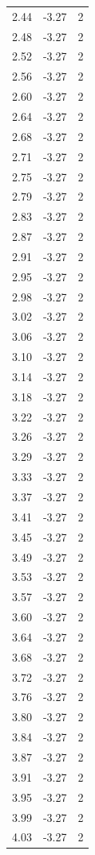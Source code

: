 \begin{longtable}{lrr}
  2.44 & -3.27 & 2 \\
  2.48 & -3.27 & 2 \\
  2.52 & -3.27 & 2 \\
  2.56 & -3.27 & 2 \\
  2.60 & -3.27 & 2 \\
  2.64 & -3.27 & 2 \\
  2.68 & -3.27 & 2 \\
  2.71 & -3.27 & 2 \\
  2.75 & -3.27 & 2 \\
  2.79 & -3.27 & 2 \\
  2.83 & -3.27 & 2 \\
  2.87 & -3.27 & 2 \\
  2.91 & -3.27 & 2 \\
  2.95 & -3.27 & 2 \\
  2.98 & -3.27 & 2 \\
  3.02 & -3.27 & 2 \\
  3.06 & -3.27 & 2 \\
  3.10 & -3.27 & 2 \\
  3.14 & -3.27 & 2 \\
  3.18 & -3.27 & 2 \\
  3.22 & -3.27 & 2 \\
  3.26 & -3.27 & 2 \\
  3.29 & -3.27 & 2 \\
  3.33 & -3.27 & 2 \\
  3.37 & -3.27 & 2 \\
  3.41 & -3.27 & 2 \\
  3.45 & -3.27 & 2 \\
  3.49 & -3.27 & 2 \\
  3.53 & -3.27 & 2 \\
  3.57 & -3.27 & 2 \\
  3.60 & -3.27 & 2 \\
  3.64 & -3.27 & 2 \\
  3.68 & -3.27 & 2 \\
  3.72 & -3.27 & 2 \\
  3.76 & -3.27 & 2 \\
  3.80 & -3.27 & 2 \\
  3.84 & -3.27 & 2 \\
  3.87 & -3.27 & 2 \\
  3.91 & -3.27 & 2 \\
  3.95 & -3.27 & 2 \\
  3.99 & -3.27 & 2 \\
  4.03 & -3.27 & 2 \\

\end{longtable}
